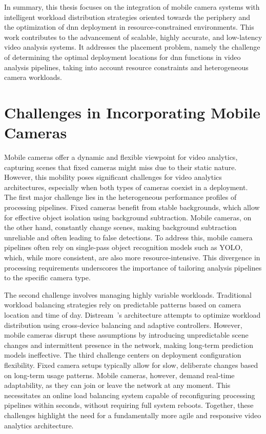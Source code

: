 In summary, this thesis focuses on the integration of mobile camera systems with intelligent workload distribution strategies oriented towards the periphery and the optimization of \acrshort{dnn} deployment in resource-constrained environments. This work contributes to the advancement of scalable, highly accurate, and low-latency video analysis systems.
It addresses the placement problem, namely the challenge of determining the optimal deployment locations for \acrshort{dnn} functions in video analysis pipelines, taking into account resource constraints and heterogeneous camera workloads.

\section{Challenges in Incorporating Mobile Cameras}

Mobile cameras offer a dynamic and flexible viewpoint for video analytics, capturing scenes that fixed cameras might miss due to their static nature. However, this mobility poses significant challenges for video analytics architectures, especially when both types of cameras coexist in a deployment. The first major challenge lies in the heterogeneous performance profiles of processing pipelines. Fixed cameras benefit from stable backgrounds, which allow for effective object isolation using background subtraction. Mobile cameras, on the other hand, constantly change scenes, making background subtraction unreliable and often leading to false detections. To address this, mobile camera pipelines often rely on single-pass object recognition models such as YOLO, which, while more consistent, are also more resource-intensive. This divergence in processing requirements underscores the importance of tailoring analysis pipelines to the specific camera type.

The second challenge involves managing highly variable workloads. Traditional workload balancing strategies rely on predictable patterns based on camera location and time of day. Distream~\cite{zeng2020distream}'s architecture attempts to optimize workload distribution using cross-device balancing and adaptive controllers. However, mobile cameras disrupt these assumptions by introducing unpredictable scene changes and intermittent presence in the network, making long-term prediction models ineffective. The third challenge centers on deployment configuration flexibility. Fixed camera setups typically allow for slow, deliberate changes based on long-term usage patterns. Mobile cameras, however, demand real-time adaptability, as they can join or leave the network at any moment. This necessitates an online load balancing system capable of reconfiguring processing pipelines within seconds, without requiring full system reboots. Together, these challenges highlight the need for a fundamentally more agile and responsive video analytics architecture.

